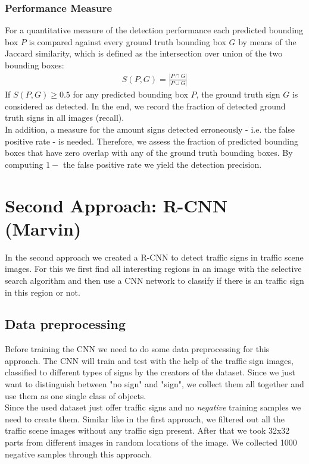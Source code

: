 \documentclass[12pt,a4paper,bibliography=totocnumbered,listof=totocnumbered]{scrartcl}
\begin{document}
\subsubsection{Performance Measure} \label{ssec:perf}
For a quantitative measure of the detection performance each predicted bounding box $P$ is compared against every ground truth bounding box $G$ by means of the Jaccard similarity, which is defined as the intersection over union of the two bounding boxes: 
\begin{align*}
	S(P,G) = \frac{|P \cap G|}{|P \cup G|}
\end{align*}
If $S(P,G) \geq 0.5$ for any predicted bounding box $P$, the ground truth sign $G$ is considered as detected. In the end, we record the fraction of detected ground truth signs in all images (recall). \\
In addition, a measure for the amount signs detected erroneously - i.e. the false positive rate - is needed.  Therefore, we assess the fraction of predicted bounding boxes that have zero overlap with any of the ground truth bounding boxes. By computing $1-$ the false positive rate we yield the detection precision. 

\pagebreak
\section{Second Approach: R-CNN \small{(Marvin)}}
In the second approach we created a R-CNN to detect traffic signs in traffic scene images. For this we first find all interesting regions in an image with the selective search algorithm and then use a CNN network to classify if there is an traffic sign in this region or not.

\subsection{Data preprocessing}

Before training the CNN we need to do some data preprocessing for this approach. The CNN will train and test with the help of the traffic sign images, classified to different types of signs by the creators of the dataset. Since we just want to distinguish between "no sign" and "sign", we collect them all together and use them as one single class of objects.\\Since the used dataset just offer traffic signs and no \textit{negative} training samples we need to create them. Similar like in the first approach, we filtered out all the traffic scene images without any traffic sign present. After that we took 32x32 parts from different images in random locations of the image. We collected 1000 negative samples through this approach.\\\\
\end{document}
